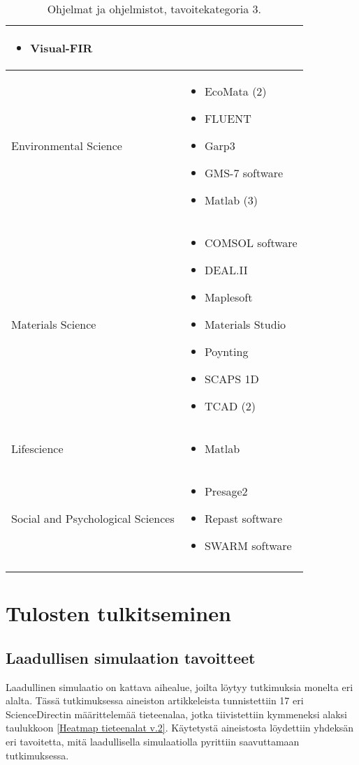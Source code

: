 \documentclass[utf8]{gradu3}
\begin{document}
\begin{longtable}[h]{|p{5cm}|p{8cm}|}
\begin{itemize}
        \item Visual-FIR
    \end{itemize} \\
    \hline
    Environmental Science & \begin{itemize}
        \item EcoMata (2)
        \item FLUENT
        \item Garp3
        \item GMS-7 software
        \item Matlab (3)
    \end{itemize} \\
    \hline
    Materials Science & \begin{itemize}
        \item COMSOL software
        \item DEAL.II 
        \item Maplesoft
        \item Materials Studio
        \item Poynting
        \item SCAPS 1D
        \item TCAD (2)
    \end{itemize} \\
    \hline
    Lifescience & \begin{itemize}
        \item Matlab
    \end{itemize} \\
    \hline
    Social and Psychological Sciences & \begin{itemize}
        \item Presage2
        \item Repast software
        \item SWARM software
    \end{itemize} \\
    \hline
    \caption{Ohjelmat ja ohjelmistot, tavoitekategoria 3.}
    \label{table:ohjelmistot 3.}
\end{longtable}

\chapter{Tulosten tulkitseminen}

\section{Laadullisen simulaation tavoitteet}
Laadullinen simulaatio on kattava aihealue, joilta löytyy tutkimuksia monelta eri alalta. Tässä tutkimuksessa aineiston artikkeleista tunnistettiin 17 
eri ScienceDirectin määrittelemää tieteenalaa, 
jotka tiivistettiin kymmeneksi alaksi taulukkoon 
\ref{Heatmap tieteenalat v.2}.
Käytetystä aineistosta löydettiin yhdeksän eri tavoitetta, mitä laadullisella simulaatiolla pyrittiin saavuttamaan tutkimuksessa.
\end{document}
